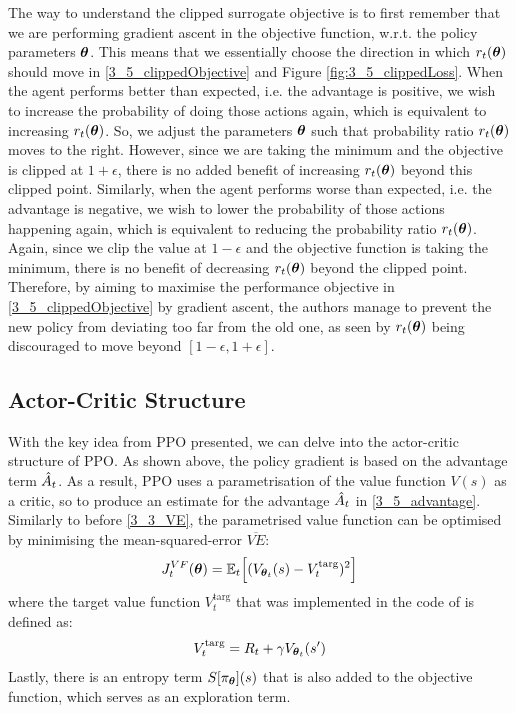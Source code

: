 The way to understand the clipped surrogate objective is to first remember that we are performing gradient ascent in the objective function, w.r.t. the policy parameters $\boldsymbol{\theta}$. This means that we essentially choose the direction in which $r_t(\boldsymbol{\theta})$ should move in \eqref{3_5_clippedObjective} and Figure \ref{fig:3_5_clippedLoss}. When the agent performs better than expected, i.e. the advantage is positive, we wish to increase the probability of doing those actions again, which is equivalent to increasing $r_t(\boldsymbol{\theta})$. So, we adjust the parameters $\boldsymbol{\theta}$ such that probability ratio $r_t(\boldsymbol{\theta})$ moves to the right. However, since we are taking the minimum and the objective is clipped at $1+\epsilon$, there is no added benefit of increasing $r_t(\boldsymbol{\theta})$ beyond this clipped point. Similarly, when the agent performs worse than expected, i.e. the advantage is negative, we wish to lower the probability of those actions happening again, which is equivalent to reducing the probability ratio $r_t(\boldsymbol{\theta})$. Again, since we clip the value at $1-\epsilon$ and the objective function is taking the minimum, there is no benefit of decreasing $r_t(\boldsymbol{\theta})$ beyond the clipped point. Therefore, by aiming to maximise the performance objective in \eqref{3_5_clippedObjective} by gradient ascent, the authors manage to prevent the new policy from deviating too far from the old one, as seen by $r_t(\boldsymbol{\theta})$ being discouraged to move beyond $[1-\epsilon, 1+\epsilon]$. 


\subsection{Actor-Critic Structure}
\label{subsec:3_ppo_actorCritic}
With the key idea from PPO presented, we can delve into the actor-critic structure of PPO. As shown above, the policy gradient is based on the advantage term $\hat{A}_t$. As a result, PPO uses a parametrisation of the value function $V(s)$ as a critic, so to produce an estimate for the advantage $\hat{A}_t$ in \eqref{3_5_advantage}.
Similarly to before \eqref{3_3_VE}, the parametrised value function can be optimised by minimising the mean-squared-error $\overline{VE}$:
\begin{equation}
    J_t^{VF}(\boldsymbol{\theta}) = \mathbb{E}_t \Big[(V_{\boldsymbol{\theta}_t}(s) - V_t^{\text{targ}})^2\Big] \label{3_5_criticLoss}
\end{equation}
where the target value function $V_t^{\text{targ}}$ that was implemented in the code of \cite{PPO} is defined as:
\begin{equation}
    V_t^{\text{targ}} = R_t + \gamma V_{\boldsymbol{\theta}_t}(s')
\end{equation}
Lastly, there is an entropy term $S[\pi_{\boldsymbol{\theta}}](s)$ that is also added to the objective function, which serves as an exploration term. 

